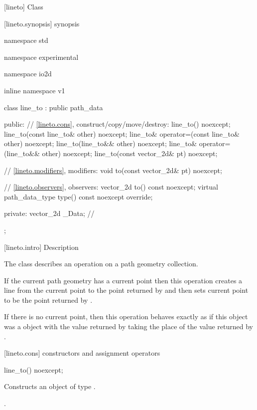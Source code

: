  [lineto] {Class }

 [lineto.synopsis] { synopsis}

\begin{codeblock}
namespace std { namespace experimental { namespace io2d { inline namespace v1 {
  class line_to : public path_data {
  public:
    // \ref{lineto.cons}, construct/copy/move/destroy:
    line_to() noexcept;
    line_to(const line_to& other) noexcept;
    line_to& operator=(const line_to& other) noexcept;
    line_to(line_to&& other) noexcept;
    line_to& operator=(line_to&& other) noexcept;
    line_to(const vector_2d& pt) noexcept;

    // \ref{lineto.modifiers}, modifiers:
    void to(const vector_2d& pt) noexcept;

    // \ref{lineto.observers}, observers:
    vector_2d to() const noexcept;
    virtual path_data_type type() const noexcept override;
    
  private:
    vector_2d _Data; // \expos
  };
} } } }
\end{codeblock}

 [lineto.intro] { Description}

\pnum
{}
The class  describes an operation on a path geometry collection.

\pnum
If the current path geometry has a current point then this operation creates a line from the current point to the point returned by  and then sets current point to be the point returned by .

\pnum
If there is no current point, then this operation behaves exactly as if this object was a  object with the value returned by  taking the place of the value returned by .

 [lineto.cons] { constructors and assignment operators}

\begin{itemdecl}
    line_to() noexcept;
\end{itemdecl}
\begin{itemdescr}
	\pnum
	\effects
	Constructs an object of type .
	
	\pnum
	\postconditions
	.
\end{itemdescr}


